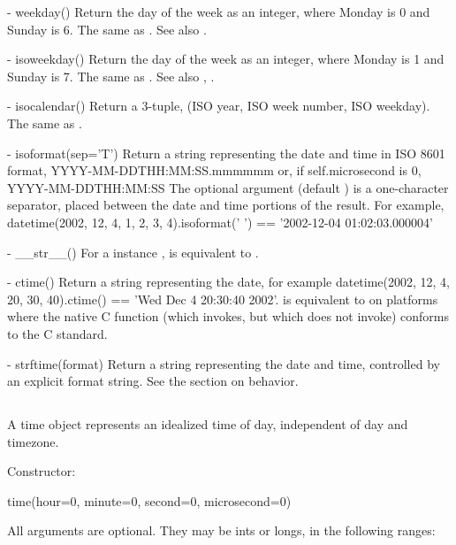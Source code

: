   - weekday()
    Return the day of the week as an integer, where Monday is 0 and
    Sunday is 6.  The same as .
    See also .

  - isoweekday()
    Return the day of the week as an integer, where Monday is 1 and
    Sunday is 7.  The same as .
    See also , .

  - isocalendar()
    Return a 3-tuple, (ISO year, ISO week number, ISO weekday).  The
    same as .

  - isoformat(sep='T')
    Return a string representing the date and time in ISO 8601 format,
        YYYY-MM-DDTHH:MM:SS.mmmmmm
    or, if self.microsecond is 0,
        YYYY-MM-DDTHH:MM:SS
    The optional argument  (default ) is a
    one-character separator, placed between the date and time portions
    of the result.  For example,
        datetime(2002, 12, 4, 1, 2, 3, 4).isoformat(' ') ==
        '2002-12-04 01:02:03.000004'

  - __str__()
    For a  instance ,  is
    equivalent to .

  - ctime()
    Return a string representing the date, for example
    datetime(2002, 12, 4, 20, 30, 40).ctime() == 'Wed Dec  4 20:30:40 2002'.
     is equivalent to
     on platforms where
    the native C  function (which
     invokes, but which
     does not invoke) conforms to the C
    standard.

  - strftime(format)
    Return a string representing the date and time, controlled by an
    explicit format string.  See the section on 
    behavior.


\subsection{ \label{datetime-time}}

A time object represents an idealized time of day, independent of day
and timezone.

Constructor:

    time(hour=0, minute=0, second=0, microsecond=0)

    All arguments are optional.  They may be ints or longs, in the
    following ranges:

